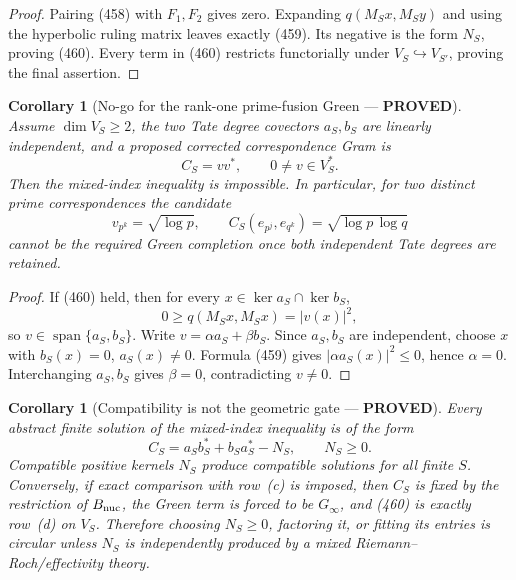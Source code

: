 \documentclass[11pt]{article}
\newtheorem{corollary}[theorem]{Corollary}
\newcommand{\PROVED}{\textcolor{green!45!black}{\textbf{PROVED}}}
\begin{document}
\begin{proof}
Pairing (458) with \(F_1,F_2\) gives zero.  Expanding
\(q(M_Sx,M_Sy)\) and using the hyperbolic ruling matrix leaves exactly
(459).  Its negative is the form \(N_S\), proving (460).  Every term in
(460) restricts functorially under \(V_S\hookrightarrow V_{S'}\), proving
the final assertion.
\end{proof}

\begin{corollary}[No-go for the rank-one prime-fusion Green --- \PROVED]
Assume \(\dim V_S\ge2\), the two Tate degree covectors \(a_S,b_S\) are
linearly independent, and a proposed corrected correspondence Gram is
\begin{equation}
 C_S=vv^*,\qquad 0\ne v\in V_S^*.                    \tag{461}
\end{equation}
Then the mixed-index inequality is impossible.  In particular, for two
distinct prime correspondences the candidate
\[
 v_{p^k}=\sqrt{\log p},\qquad
 C_S(e_{p^j},e_{q^k})=\sqrt{\log p\,\log q}
\]
cannot be the required Green completion once both independent Tate degrees
are retained.
\end{corollary}

\begin{proof}
If (460) held, then for every
\(x\in\ker a_S\cap\ker b_S\),
\[
 0\ge q(M_Sx,M_Sx)=|v(x)|^2,
\]
so \(v\in\operatorname{span}\{a_S,b_S\}\).  Write
\(v=\alpha a_S+\beta b_S\).  Since \(a_S,b_S\) are independent, choose
\(x\) with \(b_S(x)=0\), \(a_S(x)\ne0\).  Formula (459) gives
\(|\alpha a_S(x)|^2\le0\), hence \(\alpha=0\).  Interchanging \(a_S,b_S\)
gives \(\beta=0\), contradicting \(v\ne0\).
\end{proof}

\begin{corollary}[Compatibility is not the geometric gate --- \PROVED]
Every abstract finite solution of the mixed-index inequality is of the form
\begin{equation}
 C_S=a_Sb_S^*+b_Sa_S^*-N_S,\qquad N_S\ge0.           \tag{462}
\end{equation}
Compatible positive kernels \(N_S\) produce compatible solutions for all
finite \(S\).  Conversely, if exact comparison with row~(c) is imposed,
then \(C_S\) is fixed by the restriction of \(B_{\rm nuc}\), the Green term
is forced to be \(G_\infty\), and (460) is exactly row~(d) on \(V_S\).
Therefore choosing \(N_S\ge0\), factoring it, or fitting its entries is
circular unless \(N_S\) is independently produced by a mixed
Riemann--Roch/effectivity theory.
\end{corollary}
\end{document}
